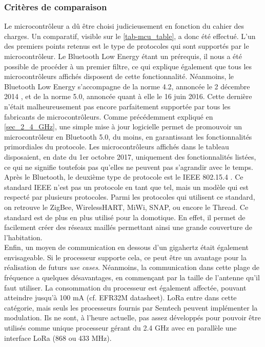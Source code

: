 \subsubsection{Critères de comparaison}
Le microcontrôleur a dû être choisi judicieusement en fonction du cahier des charges. Un comparatif, visible sur le \cref{tab-mcu_table}, a donc été effectué.  L'un des premiers points retenus est le type de protocoles qui sont supportés par le microcontrôleur. Le Bluetooth Low Energy étant un prérequis, il nous a été possible de procéder à un premier filtre, ce qui explique également que tous les microcontrôleurs affichés disposent de cette fonctionnalité. Néanmoins, le Bluetooth Low Energy s'accompagne de la norme 4.2, annoncée le 2 décembre 2014 \cite{Bluetoot59:online}, et de la norme 5.0, annoncée quant à elle le 16 juin 2016. Cette dernière n'était malheureusement pas encore parfaitement supportée par tous les fabricants de microcontrôleurs. Comme précédemment expliqué en \cref{sec_2_4_GHz}, une simple mise à jour logicielle permet de promouvoir un microcontrôleur en Bluetooth 5.0, du moins, en garantissant les fonctionnalités primordiales du protocole. Les microcontrôleurs affichés dans le tableau disposaient, en date du 1er octobre 2017, uniquement des fonctionnalités listées, ce qui ne signifie toutefois pas qu'elles ne peuvent pas s'agrandir avec le temps. \\

Après le Bluetooth, le deuxième type de protocole est le IEEE 802.15.4 \cite{IEEE802137:online}. Ce standard IEEE n'est pas un protocole en tant que tel, mais un modèle qui est respecté par plusieurs protocoles. Parmi les protocoles qui utilisent ce standard, on retrouve le ZigBee, WirelessHART, MiWi, SNAP, ou encore le Thread. Ce standard est de plus en plus utilisé pour la domotique. En effet, il permet de facilement créer des réseaux maillés permettant ainsi une grande couverture de l'habitation.\\

Enfin, un moyen de communication en dessous d'un gigahertz était également envisageable. Si le processeur supporte cela, ce peut être un avantage pour la réalisation de futurs \textit{use cases}. Néanmoins, la communication dans cette plage de fréquence a quelques désavantages, en commençant par la taille de l'antenne qu'il faut utiliser. La consommation du processeur est également affectée, pouvant atteindre jusqu'à 100 mA (cf. EFR32M datasheet). LoRa entre dans cette catégorie, mais seuls les processeurs fournis par Semtech peuvent implémenter la modulation. Ils ne sont, à l'heure actuelle, pas assez développés pour pouvoir être utilisés comme unique processeur gérant du 2.4 GHz avec en parallèle une interface LoRa (868 ou 433 MHz). \\

